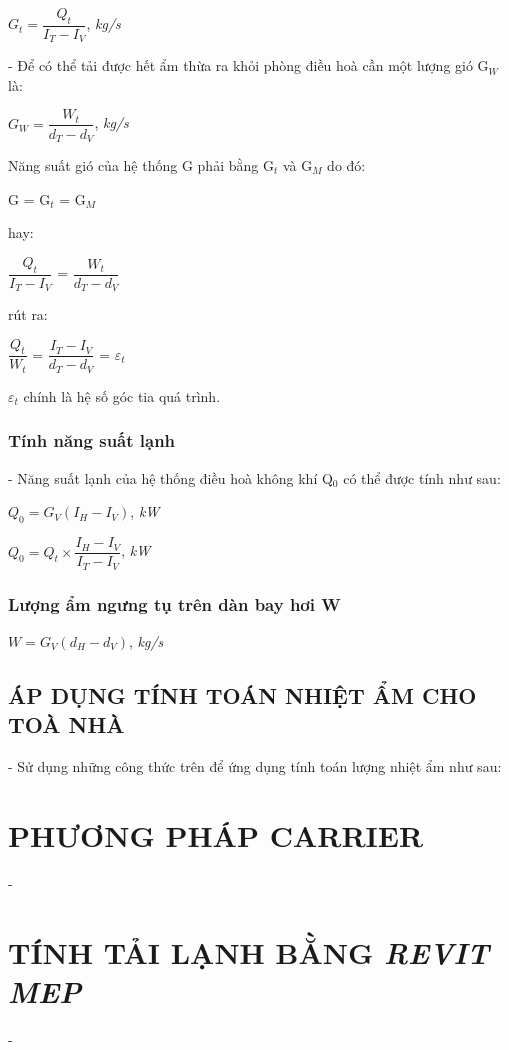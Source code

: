\begin{center}
	$ G_{t} = \dfrac{Q_{t}}{I_{T} - I_{V}} $, \textit{kg/s}
\end{center}

- Để có thể tải được hết ẩm thừa ra khỏi phòng điều hoà cần một lượng gió G$_{W}$ là:

\begin{center}
	$ G_{W} = \dfrac{W_{t}}{d_{T} - d_{V}} $, \textit{kg/s}
\end{center}

Năng suất gió của hệ thống G phải bằng G$_{t}$ và G$_{M}$ do đó:

\begin{center}
	G = G$_{t}$ = G$_{M}$
\end{center}

hay:

\begin{center}
	$ \dfrac{Q_{t}}{I_{T} - I_{V}} $ = $\dfrac{W_{t}}{d_{T} - d_{V}} $
\end{center}

rút ra:

\begin{center}
	$ \dfrac{Q_{t}}{W_{t}} $ = $ \dfrac{I_{T} - I_{V}}{d_{T} - d_{V}} $ = {\Large $\varepsilon_{t}$}
\end{center}

{\Large $\varepsilon_{t}$} chính là hệ số góc tia quá trình.

\subsubsection{Tính năng suất lạnh}
- Năng suất lạnh của hệ thống điều hoà không khí Q$ _{0} $ có thể được tính như sau:

\begin{center}
	$Q _{0} = G_{V}(I_{H} - I_{V})$, \textit{kW}
\end{center}
\begin{center}
	$ Q _{0} = Q_{t}\times\dfrac{I_{H} - I_{V}}{I_{T} - I_{V}}$, \textit{kW}
\end{center}

\subsubsection{Lượng ẩm ngưng tụ trên dàn bay hơi W}
\begin{center}
	$W = G_{V}(d_{H}-d_{V})$, \textit{kg/s}
\end{center}

\subsection{ÁP DỤNG TÍNH TOÁN NHIỆT ẨM CHO TOÀ NHÀ}
- Sử dụng những công thức trên để ứng dụng tính toán lượng nhiệt ẩm như sau: 




\section{PHƯƠNG PHÁP CARRIER}
- 

\section{TÍNH TẢI LẠNH BẰNG \emph{REVIT MEP}}
- 

